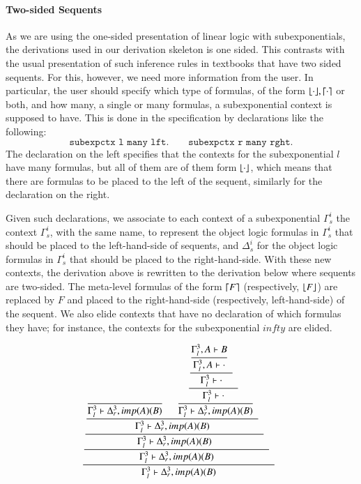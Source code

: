 \documentclass{ebl}
\begin{document}
\paragraph{Two-sided Sequents}
As we are using the one-sided presentation of linear logic with subexponentials, the derivations used 
in our derivation skeleton is one sided. This contrasts with the usual presentation of such inference
rules in textbooks that have two sided sequents. For this, however, we need more information from the 
user. In particular, the user should specify which type of formulas, of the form $\lfloor \cdot \rfloor, \lceil \cdot \rceil$ or both, 
and how many, a single or many formulas, a subexponential context is supposed to have. 
This is done in the specification by declarations like the following:
\[
 \texttt{subexpctx l many lft.} \qquad
 \texttt{subexpctx r many rght.}
\]
The declaration on the left specifies that the contexts for the subexponential
$l$ have many formulas, but all of them are of them form $\lfloor \cdot \rfloor$, which
means that there are formulas to be placed to the left of the sequent, similarly
for the declaration on the right.

Given such declarations, we associate to each context of a subexponential $\Gamma_s^i$ the context
$\Gamma_s^i$, with the same name, to represent the object logic formulas in $\Gamma_s^i$ that should be 
placed to the left-hand-side of sequents, and $\Delta_s^i$ for the object logic formulas in  $\Gamma_s^i$
that should be placed to the right-hand-side. With these new contexts, the derivation above is rewritten 
to the derivation below where sequents are two-sided. The meta-level formulas of the form $\lceil F \rceil$ (respectively, 
$\lfloor F \rfloor$) are replaced by $F$ and placed to the right-hand-side (respectively, left-hand-side) of the sequent. 
We also elide contexts that have no declaration of which formulas they have; for instance, the contexts for the 
subexponential $infty$ are elided.

{\small\[\cfrac{\cfrac{\cfrac{\cfrac{\cfrac{}
{\Gamma_{l}^{3}  \vdash \Delta_{r}^{3}, imp (A) (B)  } \;\; 
\quad
\cfrac{\cfrac{\cfrac{\cfrac{\Gamma_{l}^{3}, A  \vdash B }
{\Gamma_{l}^{3}, A  \vdash  \cdot } \;\; }
{\Gamma_{l}^{3}  \vdash  \cdot } \;\; }
{\Gamma_{l}^{3}  \vdash  \cdot } \;\; }
{\Gamma_{l}^{3}  \vdash \Delta_{r}^{3}, imp (A) (B)  } \;\; }
{\Gamma_{l}^{3}  \vdash \Delta_{r}^{3}, imp (A) (B)  } \;\; }
{\Gamma_{l}^{3}  \vdash \Delta_{r}^{3}, imp (A) (B)  } \;\; }
{\Gamma_{l}^{3}  \vdash \Delta_{r}^{3}, imp (A) (B)  } \;\; }
{\Gamma_{l}^{3}  \vdash \Delta_{r}^{3}, imp (A) (B)  } \;\; \]}
\end{document}
